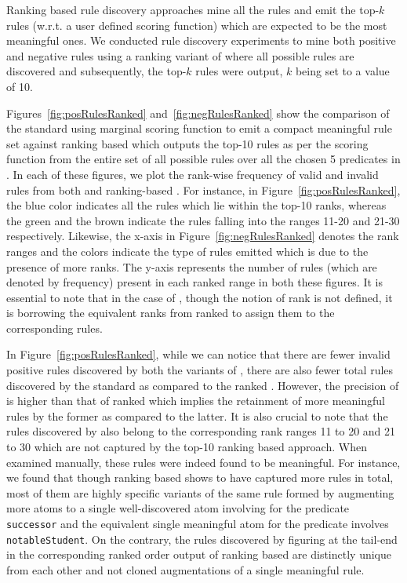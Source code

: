 Ranking based rule discovery approaches mine all the rules and emit the top-$k$ rules (w.r.t. a user defined scoring function) which are expected to be the most meaningful ones. We conducted rule discovery experiments to mine both positive and negative rules using a ranking variant of \krd where all possible rules are discovered and subsequently, the top-$k$ rules were output, $k$ being set to a value of 10. 

Figures~\ref{fig:posRulesRanked} and~\ref{fig:negRulesRanked} show the comparison of the standard \krd using marginal scoring function to emit a compact meaningful rule set against ranking based \krd which outputs the top-10 rules as per the scoring function from the entire set of all possible rules over all the chosen 5 predicates in \dbpedia. In each of these figures, we plot the rank-wise frequency of valid and invalid rules from both \krd and ranking-based \krd. For instance, in Figure~\ref{fig:posRulesRanked}, the blue color indicates all the rules which lie within the top-10 ranks, whereas the green and the brown indicate the rules falling into the ranges 11-20 and 21-30 respectively. Likewise, the x-axis in Figure~\ref{fig:negRulesRanked} denotes the rank ranges and the colors indicate the type of rules emitted which is due to the presence of more ranks. The y-axis represents the number of rules (which are denoted by frequency) present in each ranked range in both these figures. It is essential to note that in the case of \krd, though the notion of rank is not defined, it is borrowing the equivalent ranks from ranked \krd to assign them to the corresponding rules.

In Figure~\ref{fig:posRulesRanked}, while we can notice that there are fewer invalid positive rules discovered by both the variants of \krd, there are also fewer total rules discovered by the standard \krd as compared to the ranked \krd. However, the precision of \krd is higher than that of ranked \krd which implies the retainment of more meaningful rules by the former as compared to the latter. It is also crucial to note that the rules discovered by \krd also belong to the corresponding rank ranges 11 to 20 and 21 to 30 which are not captured by the top-10 ranking based approach. When examined manually, these rules were indeed found to be meaningful. For instance, we found that though ranking based \krd shows to have captured more rules in total, most of them are highly specific variants of the same rule formed by augmenting more atoms to a single well-discovered atom involving  for the predicate \texttt{successor} and the equivalent single meaningful atom for the predicate  involves \texttt{notableStudent}. On the contrary, the rules discovered by \krd figuring at the tail-end in the corresponding ranked order output of ranking based \krd are distinctly unique from each other and not cloned augmentations of a single meaningful rule.

